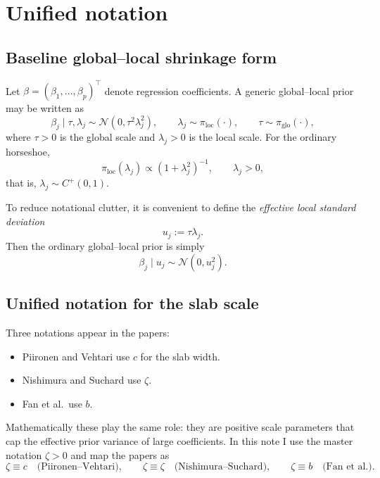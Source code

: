 \documentclass[11pt]{article}
\newcommand{\Normal}{\mathcal{N}}
\newcommand{\Loc}{\pi_{\mathrm{loc}}}
\newcommand{\Glo}{\pi_{\mathrm{glo}}}
\begin{document}
\section{Unified notation}

\subsection{Baseline global--local shrinkage form}

Let $\beta=(\beta_1,\dots,\beta_p)^\top$ denote regression coefficients. A generic global--local prior may be written as
\begin{equation}
\beta_j \mid \tau,\lambda_j \sim \Normal(0,\tau^2\lambda_j^2), 
\qquad 
\lambda_j \sim \Loc(\cdot),
\qquad
\tau \sim \Glo(\cdot),
\label{eq:global-local}
\end{equation}
where $\tau>0$ is the global scale and $\lambda_j>0$ is the local scale. For the ordinary horseshoe,
\[
\Loc(\lambda_j)\propto (1+\lambda_j^2)^{-1}, \qquad \lambda_j>0,
\]
that is, $\lambda_j \sim C^+(0,1)$.

To reduce notational clutter, it is convenient to define the \emph{effective local standard deviation}
\begin{equation}
u_j := \tau \lambda_j .
\label{eq:uj}
\end{equation}
Then the ordinary global--local prior is simply
\[
\beta_j \mid u_j \sim \Normal(0,u_j^2).
\]

\subsection{Unified notation for the slab scale}

Three notations appear in the papers:
\begin{itemize}
\item Piironen and Vehtari use $c$ for the slab width.
\item Nishimura and Suchard use $\zeta$.
\item Fan et al.\ use $b$.
\end{itemize}

Mathematically these play the same role: they are positive scale parameters that cap the effective prior variance of large coefficients. In this note I use the master notation $\zeta>0$ and map the papers as
\[
\zeta \equiv c \quad \text{(Piironen--Vehtari)}, 
\qquad
\zeta \equiv \zeta \quad \text{(Nishimura--Suchard)},
\qquad
\zeta \equiv b \quad \text{(Fan et al.)}.
\]
\end{document}
